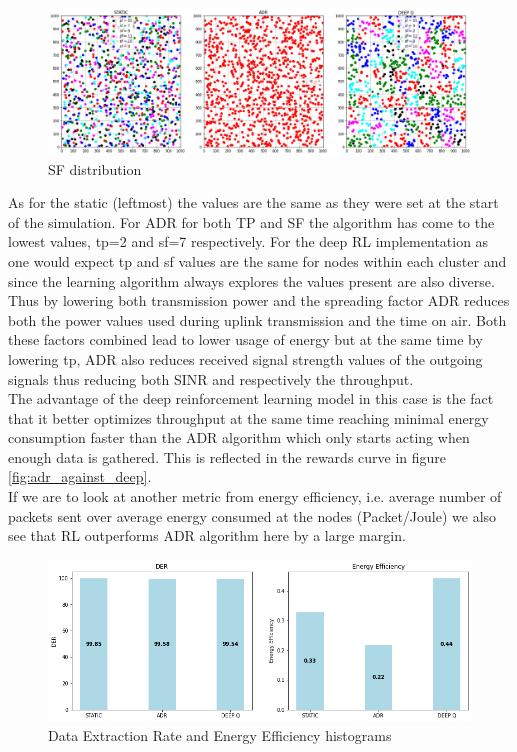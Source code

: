 \begin{figure}[H]
\centering
\hspace*{-2.5cm}  
\includegraphics[scale=0.45]{plots/adr/adr_sf_distro.png} 
\caption{SF distribution}
\end{figure}

As for the static (leftmost) the values are the same as 
they were set at the start of the simulation. For ADR for 
both TP and SF the algorithm has come to the lowest values, tp=2 and sf=7 respectively. For the deep RL 
implementation as one would expect tp and sf values
are the same for nodes within each cluster and since
the learning algorithm always explores the values present
are also diverse. \\

Thus by lowering both transmission power and the spreading
factor ADR reduces both the power values used during 
uplink transmission and the time on air. Both these factors combined lead to lower usage of energy but at the
same time by lowering tp, ADR also reduces received
signal strength values of the outgoing signals thus 
reducing both SINR and respectively the throughput.\\

The advantage of the deep reinforcement learning model
in this case is the fact that it better optimizes 
throughput at the same time reaching minimal energy 
consumption faster than the ADR algorithm which only 
starts acting when enough data is gathered. This is 
reflected in the rewards curve in figure 
\ref{fig:adr_against_deep}.\\

If we are to look at another metric from \cite{rl_lora_original} energy efficiency, i.e. average 
number of packets sent over average energy consumed at
the nodes (Packet/Joule) we also see that RL outperforms 
ADR algorithm here by a large margin.

\begin{figure}[H]
\centering
\hspace*{-0.6cm}  
\includegraphics[scale=0.40]{plots/adr/adr_hist.png}
  \caption{Data Extraction Rate and Energy Efficiency histograms}
\end{figure}


